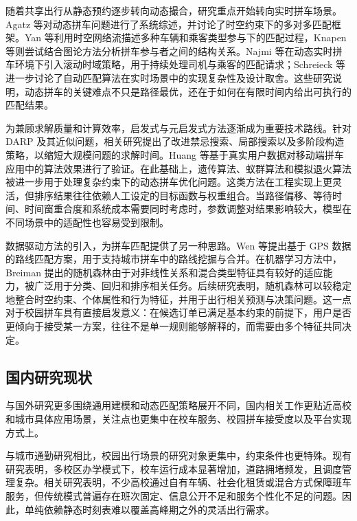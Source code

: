 随着共享出行从静态预约逐步转向动态撮合，研究重点开始转向实时拼车场景。Agatz 等对动态拼车问题进行了系统综述，并讨论了时空约束下的多对多匹配框架\cite{agatz2012}。Yan 等利用时空网络流描述多种车辆和乘客类型参与下的匹配过程\cite{yan2011}，Knapen 等则尝试结合图论方法分析拼车参与者之间的结构关系\cite{knapen2014}。Najmi 等在动态实时拼车环境下引入滚动时域策略，用于持续处理司机与乘客的匹配请求\cite{najmi2017}；Schreieck 等进一步讨论了自动匹配算法在实时场景中的实现复杂性及设计取舍\cite{schreieck2016}。这些研究说明，动态拼车的关键难点不只是路径最优，还在于如何在有限时间内给出可执行的匹配结果。

为兼顾求解质量和计算效率，启发式与元启发式方法逐渐成为重要技术路线。针对 DARP 及其近似问题，相关研究提出了改进禁忌搜索、局部搜索以及多阶段构造策略，以缩短大规模问题的求解时间\cite{ho2018}。Huang 等基于真实用户数据对移动端拼车应用中的算法效果进行了验证\cite{huang2016}。在此基础上，遗传算法\cite{huang2015}、蚁群算法\cite{huang2019}和模拟退火算法\cite{jung2016}被进一步用于处理复杂约束下的动态拼车优化问题。这类方法在工程实现上更灵活，但排序结果往往依赖人工设定的目标函数与权重组合。当路径偏移、等待时间、时间窗重合度和系统成本需要同时考虑时，参数调整对结果影响较大，模型在不同场景中的适配性也容易受到限制。

数据驱动方法的引入，为拼车匹配提供了另一种思路。Wen 等提出基于 GPS 数据的路线匹配方案，用于支持城市拼车中的路线挖掘与合并\cite{he2014}。在机器学习方法中，Breiman 提出的随机森林\cite{breiman2001}由于对非线性关系和混合类型特征具有较好的适应能力，被广泛用于分类、回归和排序相关任务。后续研究表明，随机森林可以较稳定地整合时空约束、个体属性和行为特征，并用于出行相关预测与决策问题\cite{hagenauer2017,wu2024,anil2025}。这一点对于校园拼车具有直接启发意义：在候选订单已满足基本约束的前提下，用户是否更倾向于接受某一方案，往往不是单一规则能够解释的，而需要由多个特征共同决定。

\subsection{国内研究现状}

与国外研究更多围绕通用建模和动态匹配策略展开不同，国内相关工作更贴近高校和城市具体应用场景，关注点也更集中在校车服务、校园拼车接受度以及平台实现方式上。

与城市通勤研究相比，校园出行场景的研究对象更集中，约束条件也更特殊。现有研究表明，多校区办学模式下，校车运行成本显著增加，道路拥堵频发，且调度管理复杂\cite{wu2021}。相关研究表明，不少高校通过自有车辆、社会化租赁或混合方式保障班车服务\cite{zhang2025}，但传统模式普遍存在班次固定、信息公开不足和服务个性化不足的问题\cite{xu2019}。因此，单纯依赖静态时刻表难以覆盖高峰期之外的灵活出行需求。

